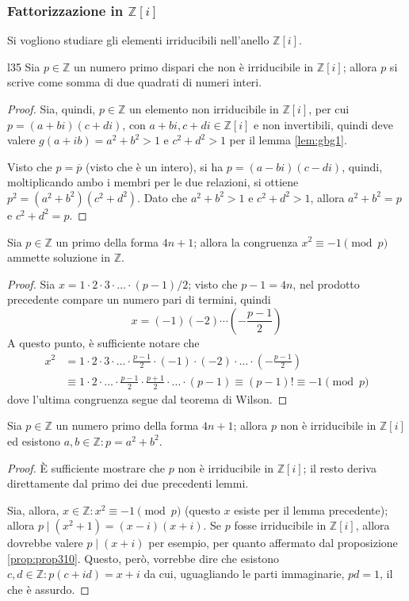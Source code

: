 \documentclass[11pt, a4paper]{scrartcl}
\theoremstyle{definition}
\numberwithin{esempio}{section}
\theoremstyle{definition}
\numberwithin{obs}{section}
\numberwithin{nota}{section}
\numberwithin{equation}{subsection}
\begin{document}
\subsubsection{Fattorizzazione in $\mathbb{Z}[i]$}
Si vogliono studiare gli elementi irriducibili nell'anello $\mathbb{Z}[i]$.
\begin{lemma}
	{}{l35}
	Sia $p\in \mathbb{Z}$ un numero primo dispari che non \`e irriducibile in $\mathbb{Z}[i]$; allora $p$ si scrive come somma di due quadrati di numeri interi.
	\begin{proof}
		Sia, quindi, $p \in \mathbb{Z}$ un elemento non irriducibile in $\mathbb{Z}[i]$, per cui $p = (a+bi)(c + di)$, con $a+bi, c+di \in \mathbb{Z}[i]$ e non invertibili, quindi deve valere $g(a+ib) = a^2 + b ^2 > 1 $ e $c^2 + d^2 > 1$ per il lemma \ref{lem:gbg1}.

		Visto che $p = \overline{p}$ (visto che \`e un intero), si ha $ p = (a-bi) (c-di)$, quindi, moltiplicando ambo i membri per le due relazioni, si ottiene $p^2 = (a^2 + b^2 )(c^2 + d^2)$. 
		Dato che $a^2 + b^2 > 1 $ e $c^2+d^2 > 1$, allora $a^2 + b^2 = p$ e $c^2 + d^2= p$.
	\end{proof}
\end{lemma}
\begin{lemma}
	{}{}
	Sia $p \in \mathbb{Z}$ un primo della forma $4 n + 1$; allora la congruenza $x^2 \equiv -1 \pmod{p} $ ammette soluzione in $\mathbb{Z}$.
	\begin{proof}
		Sia $x = 1 \cdot 2 \cdot 3 \cdot  \ldots \cdot (p-1) / 2$; visto che $p-1 = 4n$, nel prodotto precedente compare un numero pari di termini, quindi 
		\[
		x = (-1) (-2) \cdots  \left(-\frac{p-1}{2}\right) 
		\] 
		A questo punto, \`e sufficiente notare che
		\[
			\begin{split}
				x^2 &= 1 \cdot 2 \cdot 3 \cdot \ldots\cdot \frac{p-1}{2} \cdot (-1)\cdot  (-2) \cdot \ldots \cdot \left(- \frac{p-1}{2}\right) \\
				    &\equiv 1 \cdot 2 \cdot \ldots\cdot \frac{p-1}{2} \cdot \frac{p+1}{2}\cdot \ldots\cdot (p-1) \equiv (p-1)! \equiv -1 \pmod{p} 
			\end{split}
		\] 
	dove l'ultima congruenza segue dal teorema di Wilson.	
	\end{proof}
\end{lemma}
\begin{teorema}
	{}{}
	Sia $p \in \mathbb{Z}$ un numero primo della forma $4n +1$; allora $p$ non \`e irriducibile in $\mathbb{Z}[i]$ ed esistono $a,b \in \mathbb{Z} : p = a^2 + b^2$.
	\begin{proof}
		\`E sufficiente mostrare che $p$ non \`e irriducibile in $\mathbb{Z}[i]$; il resto deriva direttamente dal primo dei due precedenti lemmi.

		Sia, allora, $x \in \mathbb{Z} : x^2 \equiv -1 \pmod{p} $ (questo $x$ esiste per il lemma precedente); allora $p  \mid (x^2 + 1) = (x-i)(x+i)$.
		Se $p$ fosse irriducibile in $\mathbb{Z}[i]$, allora dovrebbe valere $p \mid (x+i)$ per esempio, per quanto affermato dal proposizione \ref{prop:prop310}.
		Questo, per\`o, vorrebbe dire che esistono $c,d \in \mathbb{Z} : p(c+id) = x+i$ da cui, uguagliando le parti immaginarie, $ pd = 1$, il che \`e assurdo.
	\end{proof}
\end{teorema}
\end{document}
